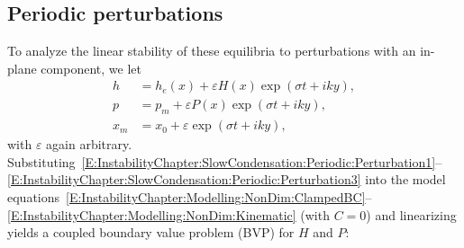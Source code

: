 \subsection{Periodic perturbations}\label{S:InstabilityChapter:SlowCondensation:PeriodicPerturbations}
\renewcommand{\Lambda}{H}
\renewcommand{\Pi}{P}
To analyze the linear stability of these equilibria to perturbations with an in-plane component, we let
\begin{align}
h &= h_e(x) + \varepsilon \Lambda(x)\exp(\sigma t + i k y),\label{E:InstabilityChapter:SlowCondensation:Periodic:Perturbation1} \\
 p &= p_m + \varepsilon \Pi(x)\exp(\sigma t + i k y),\\ x_m  &= x_0 +  \varepsilon \exp(\sigma t + i k y),\label{E:InstabilityChapter:SlowCondensation:Periodic:Perturbation3}
\end{align}
with $\varepsilon$ again arbitrary. Substituting~\eqref{E:InstabilityChapter:SlowCondensation:Periodic:Perturbation1}--\eqref{E:InstabilityChapter:SlowCondensation:Periodic:Perturbation3} into the model equations~\eqref{E:InstabilityChapter:Modelling:NonDim:ClampedBC}--\eqref{E:InstabilityChapter:Modelling:NonDim:Kinematic} (with $C = 0$) and linearizing yields a coupled boundary value problem (BVP) for $\Lambda$ and $\Pi$:

